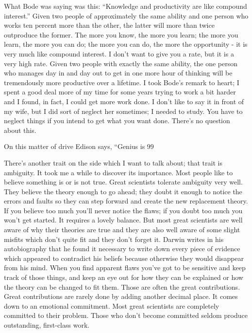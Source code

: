 \documentclass{article}
\begin{document}
What Bode was saying was this: ``Knowledge and productivity are like compound interest.'' Given two people of approximately the same ability and one person who works ten percent more than the other, the latter will more than twice outproduce the former. The more you know, the more you learn; the more you learn, the more you can do; the more you can do, the more the opportunity - it is very much like compound interest. I don't want to give you a rate, but it is a very high rate. Given two people with exactly the same ability, the one person who manages day in and day out to get in one more hour of thinking will be tremendously more productive over a lifetime. I took Bode's remark to heart; I spent a good deal more of my time for some years trying to work a bit harder and I found, in fact, I could get more work done. I don't like to say it in front of my wife, but I did sort of neglect her sometimes; I needed to study. You have to neglect things if you intend to get what you want done. There's no question about this.

On this matter of drive Edison says, ``Genius is 99%

There's another trait on the side which I want to talk about; that trait is ambiguity. It took me a while to discover its importance. Most people like to believe something is or is not true. Great scientists tolerate ambiguity very well. They believe the theory enough to go ahead; they doubt it enough to notice the errors and faults so they can step forward and create the new replacement theory. If you believe too much you'll never notice the flaws; if you doubt too much you won't get started. It requires a lovely balance. But most great scientists are well aware of why their theories are true and they are also well aware of some slight misfits which don't quite fit and they don't forget it. Darwin writes in his autobiography that he found it necessary to write down every piece of evidence which appeared to contradict his beliefs because otherwise they would disappear from his mind. When you find apparent flaws you've got to be sensitive and keep track of those things, and keep an eye out for how they can be explained or how the theory can be changed to fit them. Those are often the great contributions. Great contributions are rarely done by adding another decimal place. It comes down to an emotional commitment. Most great scientists are completely committed to their problem. Those who don't become committed seldom produce outstanding, first-class work.
\end{document}
